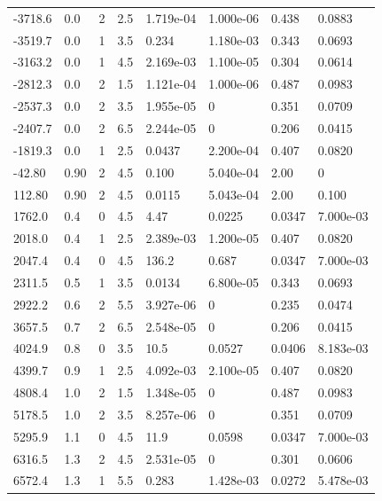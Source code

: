 \documentclass[preview]{standalone}
\begin{document}
{{\begin{tabular}{L{1.2cm}C{1.2cm} C{0.3cm}C{0.5cm} C{1.4cm}C{1.4cm} C{1.4cm}C{1.4cm}}
  -3718.6  &   0.0  & 2     & 2.5 &  1.719e-04  & 1.000e-06  & 0.438 &  0.0883   \\ 
  -3519.7  &   0.0  & 1     & 3.5 &  0.234  & 1.180e-03  & 0.343 &  0.0693   \\ 
  -3163.2  &   0.0  & 1     & 4.5 &  2.169e-03  & 1.100e-05  & 0.304 &  0.0614   \\ 
  -2812.3  &   0.0  & 2     & 1.5 &  1.121e-04  & 1.000e-06  & 0.487 &  0.0983   \\ 
  -2537.3  &   0.0  & 2     & 3.5 &  1.955e-05  & 0  & 0.351 &  0.0709   \\ 
  -2407.7  &   0.0  & 2     & 6.5 &  2.244e-05  & 0  & 0.206 &  0.0415   \\ 
  -1819.3  &   0.0  & 1     & 2.5 &  0.0437  & 2.200e-04  & 0.407 &  0.0820   \\ 
  -42.80  &  0.90  & 2     & 4.5 &  0.100  & 5.040e-04  & 2.00 &  0   \\ 
  112.80  &  0.90  & 2     & 4.5 &  0.0115  & 5.043e-04  & 2.00 &  0.100   \\ 
  1762.0  &   0.4  & 0     & 4.5 &  4.47  & 0.0225  & 0.0347 &  7.000e-03   \\ 
  2018.0  &   0.4  & 1     & 2.5 &  2.389e-03  & 1.200e-05  & 0.407 &  0.0820   \\ 
  2047.4  &   0.4  & 0     & 4.5 &  136.2  & 0.687  & 0.0347 &  7.000e-03   \\ 
  2311.5  &   0.5  & 1     & 3.5 &  0.0134  & 6.800e-05  & 0.343 &  0.0693   \\ 
  2922.2  &   0.6  & 2     & 5.5 &  3.927e-06  & 0  & 0.235 &  0.0474   \\ 
  3657.5  &   0.7  & 2     & 6.5 &  2.548e-05  & 0  & 0.206 &  0.0415   \\ 
  4024.9  &   0.8  & 0     & 3.5 &  10.5  & 0.0527  & 0.0406 &  8.183e-03   \\ 
  4399.7  &   0.9  & 1     & 2.5 &  4.092e-03  & 2.100e-05  & 0.407 &  0.0820   \\ 
  4808.4  &   1.0  & 2     & 1.5 &  1.348e-05  & 0  & 0.487 &  0.0983   \\ 
  5178.5  &   1.0  & 2     & 3.5 &  8.257e-06  & 0  & 0.351 &  0.0709   \\ 
  5295.9  &   1.1  & 0     & 4.5 &  11.9  & 0.0598  & 0.0347 &  7.000e-03   \\ 
  6316.5  &   1.3  & 2     & 4.5 &  2.531e-05  & 0  & 0.301 &  0.0606   \\ 
  6572.4  &   1.3  & 1     & 5.5 &  0.283  & 1.428e-03  & 0.0272 &  5.478e-03   \\ 

\end{tabular}}}
\end{document}

